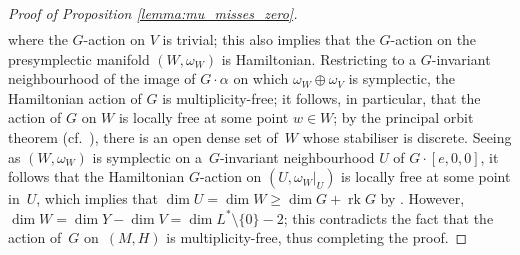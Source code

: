 \documentclass[10pt,a4paper]{amsart}
\numberwithin{equation}{section}
\newcommand{\CM}{(M,H)} %
\newcommand{\SYM}{L^* \setminus \{0\}} %
\begin{document}
\begin{proof}[Proof of Proposition \ref{lemma:mu_misses_zero}]
\begin{gather*}
 \end{gather*}
where the $G$-action on $V$ is trivial; this also implies that the $G$-action on the presymplectic manifold $(W,\omega_W)$ is Hamiltonian. Restricting to a $G$-invariant neighbourhood of the image of $G \cdot \alpha$ on which $\omega_W \oplus \omega_V$ is symplectic, the Hamiltonian action of $G$ is multiplicity-free; it follows, in particular, that the action of $G$ on $W$ is locally free at some point $w \in W$; by the principal orbit theorem (cf.\ \cite[Theorem~2.8.5]{duistermaat_kolk}), there is an open dense set of~$W$ whose stabiliser is discrete. Seeing as $(W,\omega_W)$ is symplectic on a~$G$-invariant neighbourhood $U$ of $G\cdot[e,0,0]$, it follows that the Hamiltonian $G$-action on $(U, \omega_W|_U)$ is locally free at some point in~$U$, which implies that $\dim U = \dim W \geq \dim G + \operatorname{rk} G$ by \cite[Theorem~5.1.6]{gui_sja}. However, $\dim W = \dim Y - \dim V = \dim \SYM - 2$; this contradicts the fact that the action of~$G$ on~$\CM$ is multiplicity-free, thus completing the proof.
\end{proof}
\end{document}
